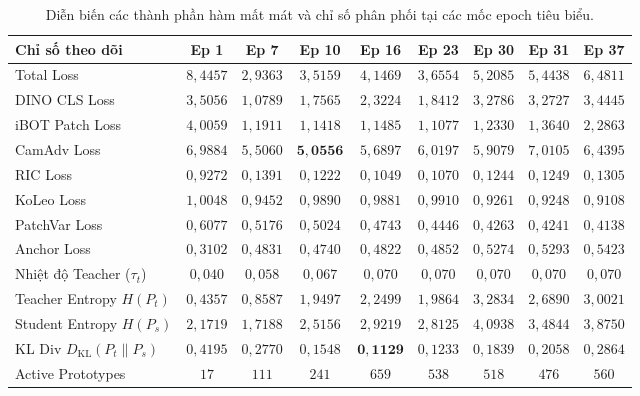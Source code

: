 \documentclass[11pt,a4paper]{article}
\begin{document}
\begin{table}[htbp]
\centering
\footnotesize
\caption{Diễn biến các thành phần hàm mất mát và chỉ số phân phối tại các mốc epoch tiêu biểu.}
\label{tab:loss_trajectory}
\begin{tabularx}{\textwidth}{>{\raggedright\arraybackslash}X cccccccc}
\toprule
\textbf{Chỉ số theo dõi} & \textbf{Ep 1} & \textbf{Ep 7} & \textbf{Ep 10} & \textbf{Ep 16} & \textbf{Ep 23} & \textbf{Ep 30} & \textbf{Ep 31} & \textbf{Ep 37} \\
\midrule
Total Loss & $8{,}4457$ & $2{,}9363$ & $3{,}5159$ & $4{,}1469$ & $3{,}6554$ & $5{,}2085$ & $5{,}4438$ & $6{,}4811$ \\
DINO CLS Loss & $3{,}5056$ & $1{,}0789$ & $1{,}7565$ & $2{,}3224$ & $1{,}8412$ & $3{,}2786$ & $3{,}2727$ & $3{,}4445$ \\
iBOT Patch Loss & $4{,}0059$ & $1{,}1911$ & $1{,}1418$ & $1{,}1485$ & $1{,}1077$ & $1{,}2330$ & $1{,}3640$ & $2{,}2863$ \\
CamAdv Loss & $6{,}9884$ & $5{,}5060$ & $\mathbf{5{,}0556}$ & $5{,}6897$ & $6{,}0197$ & $5{,}9079$ & $7{,}0105$ & $6{,}4395$ \\
RIC Loss & $0{,}9272$ & $0{,}1391$ & $0{,}1222$ & $0{,}1049$ & $0{,}1070$ & $0{,}1244$ & $0{,}1249$ & $0{,}1305$ \\
KoLeo Loss & $1{,}0048$ & $0{,}9452$ & $0{,}9890$ & $0{,}9881$ & $0{,}9910$ & $0{,}9261$ & $0{,}9248$ & $0{,}9108$ \\
PatchVar Loss & $0{,}6077$ & $0{,}5176$ & $0{,}5024$ & $0{,}4743$ & $0{,}4446$ & $0{,}4263$ & $0{,}4241$ & $0{,}4138$ \\
Anchor Loss & $0{,}3102$ & $0{,}4831$ & $0{,}4740$ & $0{,}4822$ & $0{,}4852$ & $0{,}5274$ & $0{,}5293$ & $0{,}5423$ \\
\midrule
Nhiệt độ Teacher ($\tau_t$) & $0{,}040$ & $0{,}058$ & $0{,}067$ & $0{,}070$ & $0{,}070$ & $0{,}070$ & $0{,}070$ & $0{,}070$ \\
Teacher Entropy $H(P_t)$ & $0{,}4357$ & $0{,}8587$ & $1{,}9497$ & $2{,}2499$ & $1{,}9864$ & $3{,}2834$ & $2{,}6890$ & $3{,}0021$ \\
Student Entropy $H(P_s)$ & $2{,}1719$ & $1{,}7188$ & $2{,}5156$ & $2{,}9219$ & $2{,}8125$ & $4{,}0938$ & $3{,}4844$ & $3{,}8750$ \\
KL Div $D_{\text{KL}}(P_t \parallel P_s)$ & $0{,}4195$ & $0{,}2770$ & $0{,}1548$ & $\mathbf{0{,}1129}$ & $0{,}1233$ & $0{,}1839$ & $0{,}2058$ & $0{,}2864$ \\
Active Prototypes & $17$ & $111$ & $241$ & $659$ & $538$ & $518$ & $476$ & $560$ \\
\bottomrule
\end{tabularx}
\end{table}
\end{document}
